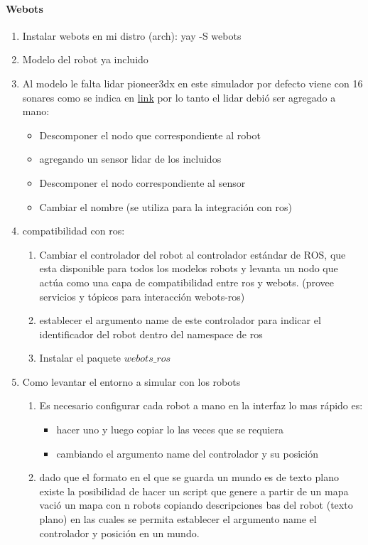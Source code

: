 \paragraph{Webots}
\begin{enumerate}
  \item Instalar webots
     en mi distro (arch): yay -S webots

  \item Modelo del robot ya incluido
  \item Al modelo le falta lidar pioneer3dx en este simulador por defecto viene con 16 sonares como se indica en \href{https://cyberbotics.com/doc/guide/pioneer-3dx}{link} por lo tanto el lidar debió ser agregado a mano:
  \begin{itemize}
    \item Descomponer el nodo que correspondiente al robot 
    \item agregando un sensor lidar de los incluidos
    \item Descomponer el nodo correspondiente al sensor
    \item Cambiar el nombre (se utiliza para la integración con ros)
  \end{itemize}
  \item compatibilidad con ros:
  \begin{enumerate}
    \item Cambiar el controlador del robot al controlador estándar de ROS, que esta disponible para todos los modelos robots y levanta un nodo que actúa como una capa de compatibilidad entre ros y webots. (provee servicios y tópicos para interacción webots-ros)
    \item establecer  el argumento name de este controlador para indicar el identificador del robot dentro del namespace de ros
    \item Instalar el paquete $webots\_ros$
  \end{enumerate}
  \item Como levantar el entorno a simular con los robots
  \begin{enumerate}
    \item Es necesario configurar cada robot a mano en la interfaz lo mas rápido es:
    \begin{itemize}
      \item hacer uno y luego copiar lo las veces que se requiera
      \item cambiando el argumento name del controlador y su posición
    \end{itemize}
    \item dado que el formato en el que se guarda un mundo es de texto plano existe la posibilidad de hacer un script que genere a partir de un mapa vació un mapa con n robots copiando descripciones bas del robot (texto plano) en las cuales se permita establecer el argumento name el controlador y posición en un mundo. 

\end{enumerate}
\end{enumerate}
